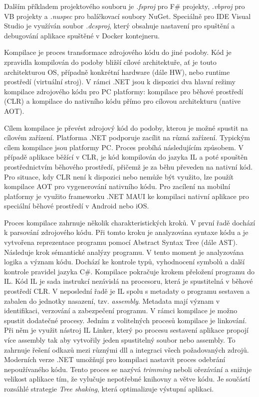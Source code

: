 Dalším příkladem projektového souboru je \emph{.fsproj} pro F\# projekty, \emph{.vbproj} pro VB projekty a \emph{.nuspec} pro balíčkovací soubory NuGet. Speciálně pro IDE Visual Studio je využíván soubor \emph{.dcsproj}, který obsahuje nastavení pro spuštění a debugování aplikace spuštěné v Docker kontejneru. 


Kompilace je proces transformace zdrojového kódu do jiné podoby. Kód je zpravidla kompilován do podoby bližší cílové architektuře, ať je touto architekturou OS, případně konkrétní hardware (dále HW), nebo runtime prostředí (virtuální stroj). \cite{Richter2012} V rámci .NET jsou k dispozici dva hlavní režimy kompilace zdrojového kódu pro PC platformy: kompilace pro běhové prostředí (CLR) a kompilace do nativního kódu přímo pro cílovou architekturu (native AOT).

Cílem kompilace je převést zdrojový kód do podoby, kterou je možné spustit na cílovém zařízení. Platforma .NET podporuje zacílit na různá zařízení. Typickým cílem kompilace jsou platformy PC. Proces probíhá následujícím způsobem. V případě aplikace běžící v CLR, je kód kompilován do jazyka IL a poté spouštěn prostřednictvím běhového prostředí, přičemž je za běhu převeden na nativní kód. \cite{Richter2012} Pro situace, kdy CLR není k dispozici nebo nemůže být využito, lze použít kompilace AOT pro vygenerování nativního kódu. \cite{Pflug2023} Pro zacílení na mobilní platformy je využito frameworku .NET MAUI ke kompilaci nativní aplikace pro speciální běhové prostředí v Android nebo iOS. \cite{Libery2023}


Proces kompilace zahrnuje několik charakteristických kroků. V první řadě dochází k parsování zdrojového kódu. Při tomto kroku je analyzována syntaxe kódu a je vytvořena reprezentace programu pomocí Abstract Syntax Tree (dále AST). Následuje krok sémantické analýzy programu. V tento moment je analyzována logika a význam kódu. Dochází ke kontrole typů, vyhodnocení symbolů a další kontrole pravidel jazyka C\#. Kompilace pokračuje krokem přeložení programu do IL. Kód IL je sada instrukcí nezávislá na procesoru, která je spustitelná v běhové prostředí CLR. \cite{Richter2012} V neposlední řadě je IL spolu s metadaty o programu sestaven a zabalen do jednotky nasazení, tzv. \emph{assembly}.  Metadata mají význam v identifikaci, verzování a zabezpečení programu. V rámci kompilace je možno spustit dodatečné procesy. Jedním z volitelných procesů kompilace je linkování. Při něm je využit nástroj IL Linker, který po procesu sestavení aplikace propojí více assembly tak aby vytvořily jeden spustitelný soubor nebo assembly. \cite{Bock2016} To zahrnuje řešení odkazů mezi různými dll a integraci všech požadovaných zdrojů. Moderních verze .NET umožňují pro kompilaci nastavit proces odebrání nepoužívaného kódu. Tento proces se nazývá \emph{trimming} neboli ořezávání a snižuje velikost aplikace tím, že vylučuje nepotřebné knihovny a větve kódu. \cite{Price2023c8} Je součástí rozsáhlé strategie \emph{Tree shaking}, která optimalizuje výstupní aplikaci.

